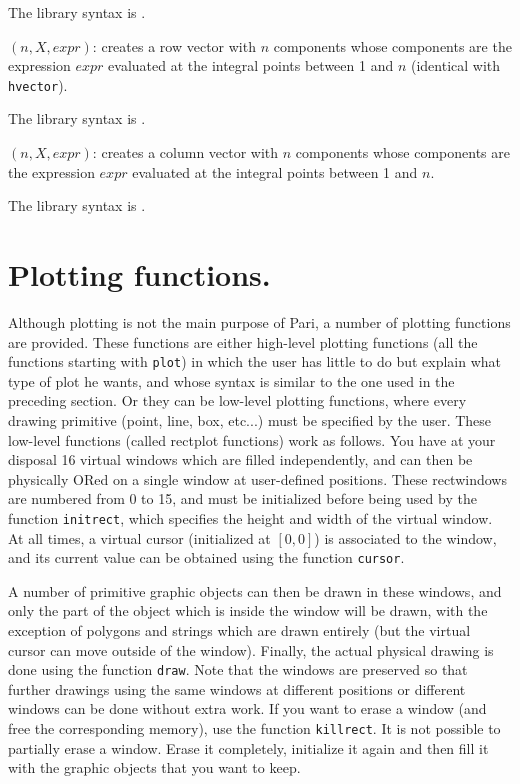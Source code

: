 The library syntax is .

$(n,X,expr)$: creates a row vector with $n$ components
whose components are the expression $expr$ evaluated at the integral points
between 1 and $n$ (identical with {\tt hvector}).

The library syntax is .

$(n,X,expr)$: creates a column vector with $n$ components
whose components are the expression $expr$ evaluated at the integral points
between 1 and $n$.

The library syntax is .

\section{Plotting functions.}

Although plotting is not the main purpose of Pari, a number of plotting
functions are provided. These functions are either high-level plotting
functions (all the functions starting with {\tt plot}) in which the user
has little to do but explain what type of plot he wants, and whose syntax
is similar to the one used in the preceding section. Or they can be low-level
plotting functions, where every drawing primitive (point, line, box, etc...)
must be specified by the user. These low-level functions (called rectplot 
functions) work as follows. You have at your disposal 16 virtual windows which
are filled independently, and can then be physically ORed on a single window at
user-defined positions. These rectwindows are numbered from 0 to 15, and must
be initialized before being used by the function {\tt initrect}, which 
specifies the height and width of the virtual window. At all times, a virtual
cursor (initialized at $[0,0]$) is associated to the window, and its current
value can be obtained using the function {\tt cursor}.

A number of primitive graphic objects can then be drawn in these windows, and
only the part of the object which is inside the window will be drawn, with
the exception of polygons and strings which are drawn entirely (but the
virtual cursor can move outside of the window). Finally, the actual physical
drawing is done using the function {\tt draw}. Note that the windows are
preserved so that further drawings using the same windows at different 
positions or different windows can be done without extra work. If you want to
erase a window (and free the corresponding memory), use the function
{\tt killrect}. It is not possible to partially erase a window. Erase it
completely, initialize it again and then fill it with the graphic
objects that you want to keep.


